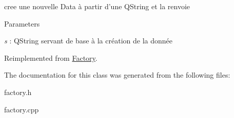 cree une nouvelle Data à partir d'une QString et la renvoie 


\begin{DoxyParams}{Parameters}
\item[{\em s}]: QString servant de base à la création de la donnée \end{DoxyParams}


Reimplemented from \hyperlink{classFactory_afe37851e80172944b37491a952a28370}{Factory}.



The documentation for this class was generated from the following files:\begin{DoxyCompactItemize}
\item 
factory.h\item 
factory.cpp\end{DoxyCompactItemize}
